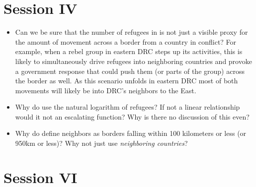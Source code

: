 \documentclass[12pt]{article}
\begin{document}
\section*{Session IV}

\begin{itemize}

	\item Can we be sure that the number of refugees in \citet{Salehyan2006}
		is not just a visible proxy for the amount of movement across a
		border from a country in conflict? For example, when a rebel
		group in eastern DRC steps up its activities, this is likely to
		simultaneously drive refugees into neighboring countries and
		provoke a government response that could push them (or parts of
		the group) across the border as well. As this scenario unfolds
		in eastern DRC most of both movements will likely be into DRC's
		neighbors to the East.

	\item  Why do \citet{Salehyan2006} use the natural logarithm of
		refugees? If not a linear relationship would it not an
		escalating function? Why is there no discussion of this even?
	
	\item Why do \citet{Salehyan2006} define neighbors as borders falling
		within 100 kilometers or less (or 950km or less)? Why not just
		use \textit{neighboring countries}?

\end{itemize}

\section*{Session VI}
\end{document}
